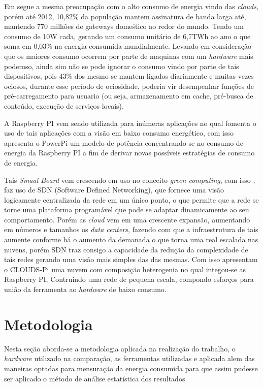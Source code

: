 \documentclass[12pt]{article}
\begin{document}
  Em \cite{PiConsumo} segue a mesma preocupação com o alto consumo de energia vindo das \textit{clouds}, porém até 2012, 10,82\% da população mantem assinatura de banda larga até, mantendo 770 milhões de gateways domeśtico ao redor do mundo. Tendo um consumo de 10W cada, gerando um consumo unitário de 6,7TWh ao ano o que soma em 0,03\% na energia consumida mundialmente. Levando em consideração que os maiores consumo ocorrem por parte de maquinas com um \textit{hardware} mais poderoso, ainda sim não se pode ignorar o consumo vindo por parte de tais dispositivos, pois 43\% dos mesmo se mantem ligados diariamente e muitas vezes ociosos, durante esse período de ociosidade, poderia vir desempenhar funções de pré-carregamento para usuario (ou seja, armazenamento em cache, pré-busca de conteúdo, execução de serviços locais).


  A Raspberry PI vem sendo utilizada para inúmeras aplicações no qual fomenta o uso de tais aplicações com a visão em baixo consumo energético, com isso \cite{PiConsumo} apresenta o PowerPi um modelo de  potência concentrando-se no consumo de energia da Raspberry PI a fim de derivar novas possíveis estratégias de consumo de energia.


  Tais \textit{Smaal Board} vem crescendo em uso no conceito \textit{green computing}, com isso \cite{2018CLOUDSPiA}, faz uso de SDN (Software Defined Networking), que fornece uma visão logicamente centralizada da rede em um único ponto, o que permite que a rede se torne uma plataforma programável que pode se adaptar dinamicamente ao seu comportamento. Porém as \textit{cloud} vem em uma crescente expansão, aumentando em números e tamanhos os \textit{data centers}, fazendo com que a infraestrutura de tais aumente conforme há o aumento da demanada o que torna uma real escalada nas nuvens, porém SDN traz consigo a capacidade da redução da complexidade de tais redes gerando uma visão mais simples das das mesmas. Com isso apresentam o CLOUDS-Pi uma nuvem com composição heterogenia no qual integou-se as Raspberry PI, Contruindo uma rede de pequena escala, compondo esforços para união da ferramenta ao \textit{hardware} de baixo consumo.    
  


\section{Metodologia} \label{sec:metodologia}
  Nesta seção aborda-se a metodologia aplicada na realização do trabalho, o \textit{hardware} utilizado na comparação, as ferramentas utilizadas e aplicada alem das maneiras optadas para mensuração da energia consumida para que assim pudesse ser aplicado o método de análise estatística dos resultados.
\end{document}
